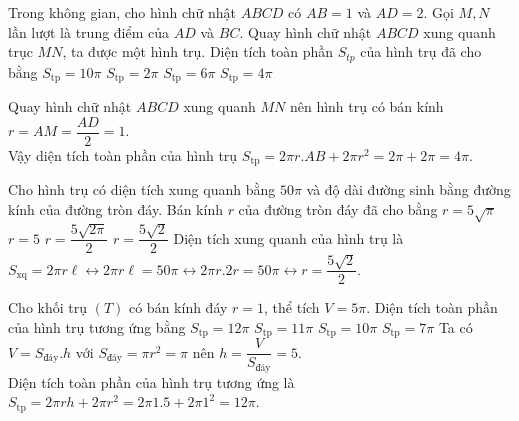\begin{ex}%
	Trong không gian, cho hình chữ nhật $ABCD$ có $AB=1$ và $AD=2$. Gọi $M,N$ lần lượt là trung điểm của $AD$ và $BC$. Quay hình chữ nhật $ABCD$ xung quanh trục $MN$, ta được một hình trụ. Diện tích toàn phần $S_{tp}$ của hình trụ đã cho bằng
	\choice
	{$S_{\text{tp}}=10\pi$}
	{$S_{\text{tp}}=2\pi$}
	{$S_{\text{tp}}=6\pi$}
	{\True $S_{\text{tp}}=4\pi$}
	\loigiai
	{\begin{center}
		\end{center}
		Quay hình chữ nhật $ABCD$ xung quanh $MN$ nên hình trụ có bán kính $r=AM=\dfrac{AD}{2}=1$.\\
		Vậy diện tích toàn phần của hình trụ $S_{\text{tp}}=2\pi r.AB+2\pi r^2=2\pi +2\pi=4\pi$.}
\end{ex}
\begin{ex}%
	Cho hình trụ có diện tích xung quanh bằng $50\pi$ và độ dài đường sinh bằng đường kính của đường tròn đáy. Bán kính $r$ của đường tròn đáy đã cho bằng
	\choice
	{$r=5\sqrt{\pi}$}
	{$r=5$}
	{$r=\dfrac{5\sqrt{2\pi}}{2}$}
	{\True $r=\dfrac{5\sqrt{2}}{2}$}
	\loigiai
	{Diện tích xung quanh của hình trụ là $S_{\text{xq}}=2\pi r\ell\leftrightarrow2\pi r\ell=50\pi\leftrightarrow2\pi r.2r=50\pi\leftrightarrow r=\dfrac{5\sqrt{2}}{2}$.}
\end{ex}
\begin{ex}%
	Cho khối trụ $(T)$ có bán kính đáy $r=1$, thể tích $V=5\pi$. Diện tích toàn phần của hình trụ tương ứng bằng
	\choice
	{\True $S_{\text{tp}}=12\pi$}
	{$S_{\text{tp}}=11\pi$}
	{$S_{\text{tp}}=10\pi$}
	{$S_{\text{tp}}=7\pi$}
	\loigiai
	{Ta có $V=S_{\text{đáy}}.h$ với $S_{\text{đáy}}=\pi r^2=\pi$ nên $h=\dfrac{V}{S_{\text{đáy}}}=5$.\\
		Diện tích toàn phần của hình trụ tương ứng là $S_{\text{tp}}=2\pi rh+2\pi r^2=2\pi 1.5+2\pi 1^2=12\pi$.}
\end{ex}
